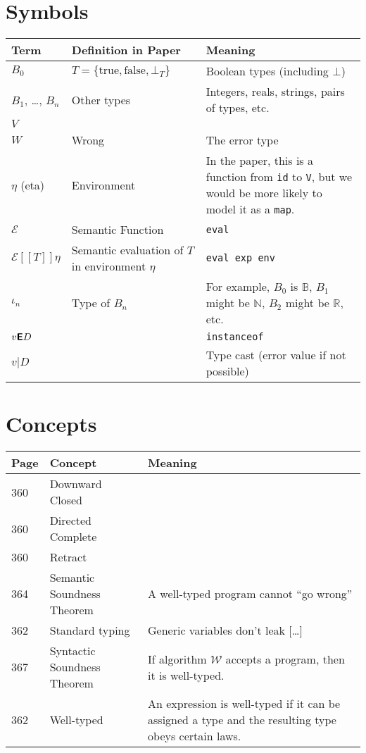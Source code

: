 \documentclass[12pt]{article}
\newcommand{\B}{\mathbb{B}}
\newcommand{\N}{\mathbb{N}}
\newcommand{\R}{\mathbb{R}}
\begin{document}
\section{Symbols}

\begin{tabular}{l p{} p{}}
\toprule
Term & Definition in Paper & Meaning \\
\midrule
$B_0$ & $T = \{\text{true}, \text{false}, \bot_T\}$ & Boolean types (including $\bot$) \\
$B_1$, \ldots, $B_n$ & Other types & Integers, reals, strings, pairs of types, etc. \\
$V$ &  & \\
$W$ & Wrong & The error type \\
$\eta$ (eta) & Environment & In the paper, this is a function from \texttt{id} to \texttt{V}, but we would be more likely to model it as a \texttt{map}.\\
$\mathscr{E}$   & Semantic Function & \tt{eval} \\
$\mathscr{E}[\![T]\!]\eta$ & Semantic evaluation of $T$ in environment $\eta$ & \texttt{eval exp env} \\
$\iota_n$ & Type of $B_n$ & For example, $B_0$ is $\B$, $B_1$ might be $\N$, $B_2$ might be $\R$, etc. \\
$v\textsf{\textbf{E}}D$ & & \texttt{instanceof} \\
$v|D$ & & Type cast (error value if not possible) \\

\bottomrule
\end{tabular}



\section{Concepts}

\begin{tabular}{l l p{}}
\toprule
Page & Concept & Meaning \\
\midrule
360 & Downward Closed &  \\
360 & Directed Complete & \\
360 & Retract & \\
364 & Semantic Soundness Theorem & A well-typed program cannot ``go wrong'' \\
362 & Standard typing & Generic variables don't leak [\ldots]\\
367 & Syntactic Soundness Theorem & If algorithm $\mathscr{W}$ accepts a program, then it is well-typed. \\
362 & Well-typed & An expression is well-typed if it can be assigned a type and the resulting type obeys certain laws.\\

\bottomrule
\end{tabular}
\end{document}

